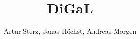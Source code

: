 \documentclass[a4paper, oneside]{book}
\begin{document}
	\begin{titlepage}
		\title{DiGaL}
		\author{Artur Sterz, Jonas Höchst, Andreas Morgen}
		\maketitle
	\end{titlepage}
	\tableofcontents
	\newpage










	
\end{document}
